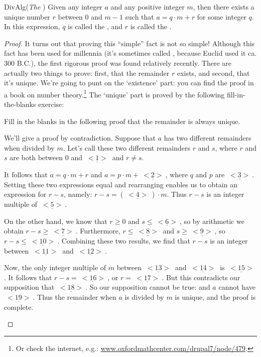 \begin{prop}{DivAlg}(\emph{The })  
Given any integer $a$ and any positive integer $m$, then there exists  a unique number $r$ between $0$ and $m-1$ such that  $a = q \cdot m + r$ for some integer $q$. In this expression, $q$  is called the  , and $r$ is called the .  
\end{prop}

\begin{proof}
It turns out that proving this ``simple'' fact is not so simple! Although this fact has been used for millennia (it's sometimes called , because Euclid used it ca. 300 B.C.), the first rigorous proof was found relatively recently.  There are actually two things to prove: first, that the remainder $r$  exists, and second, that it's unique. We're going to punt on the `existence' part: you can find the proof in a book on number theory.\footnote{Or check the internet, e.g.:  \url{www.oxfordmathcenter.com/drupal7/node/479}.}
The `unique' part is proved by the following fill-in-the-blanks exercise:

\begin{exercise}{27} 
Fill in the blanks in the following proof that the remainder is always unique.

\noindent
We'll give a proof by contradiction. Suppose that $a$ has two different remainders when divided by $m$.  Let's call these two different remainders $r$ and $s$, where $r$ and $s$ are both between 0 and $\underline{~<1>~}$ and $r \neq s$.

It follows that $a = q \cdot m + r$ and $a = p \cdot m + \underline{~<2>~}$, where $q$ and  $p$ are $\underline{~<3>~}$. Setting these two expressions equal and rearranging enables us to obtain an expression for $r-s$, namely:
$r - s = (\underline{~<4>~})\cdot m$. Thus $r-s$ is an integer multiple of $\underline{~<5>~}$.

On the other hand, we  know that $r \ge 0$ and $s \le \underline{~<6>~}$, so by arithmetic we obtain $r - s \ge \underline{~<7>~}$.
Furthermore, $r \le \underline{~<8>~}$ and $s \ge \underline{~<9>~}$, so $r - s \le \underline{~<10>~}$. Combining these two results, we find
that $r-s$ is an integer between $\underline{~<11>~}$ and $\underline{~<12>~}$.

Now, the only integer multiple of $m$ between $\underline{~<13>~}$ and $\underline{~<14>~}$ is  $\underline{~<15>~}$.  It follows that $r - s = \underline{~<16>~}$,
or $r = \underline{~<17>~}$. But this contradicts our supposition that $\underline{~<18>~}$. So our supposition cannot be true: and $a$ cannot have $\underline{~<19>~}$.
Thus the remainder when $a$ is divided by $m$ is unique, and the proof is complete.
\end{exercise}
\end{proof}


